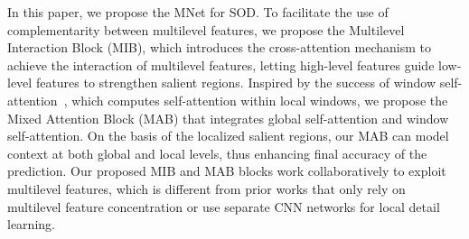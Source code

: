 \documentclass[lettersize,journal]{IEEEtran}
\begin{document}
In this paper, we propose the MNet for SOD. 
To facilitate the use of complementarity between multilevel features, we propose the Multilevel Interaction Block (MIB), which introduces the cross-attention mechanism to achieve the interaction of multilevel features, letting high-level features guide low-level features to strengthen salient regions. Inspired by the success of window self-attention~\cite{Swin}, which computes self-attention within local windows, we propose the Mixed Attention Block (MAB) that integrates global self-attention and window self-attention. On the basis of the localized salient regions, our MAB can model context at both global and local levels, thus enhancing final accuracy of the prediction. Our proposed MIB and MAB blocks work collaboratively to exploit multilevel features, which is different from prior works that only rely on multilevel feature concentration or use separate CNN networks for local detail learning. 
\end{document}
